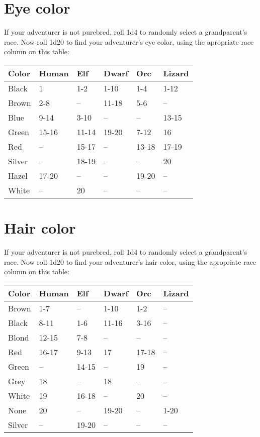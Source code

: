 \begin{multicols}{2}
\normalsize
\section{Eye color}
If your adventurer is not purebred, roll 1d4 to randomly select a grandparent's race. Now roll 1d20 to find your adventurer's eye color, using the apropriate race column on this table:

\begin{tcolorbox}[breakable,boxrule=0pt]
\begin{tabular}{l l l l l l}
Color & Human & Elf & Dwarf & Orc & Lizard\\
\midrule
Black & 1 & 1-2 & 1-10 & 1-4 & 1-12\\
Brown & 2-8 & -- & 11-18 & 5-6 & --\\
Blue & 9-14 & 3-10 & -- & -- & 13-15\\
Green & 15-16 & 11-14 & 19-20 & 7-12 & 16\\
Red & -- & 15-17 & -- & 13-18 & 17-19\\
Silver & -- & 18-19 & -- & -- & 20\\
Hazel & 17-20 & -- & -- & 19-20 & --\\
White & -- & 20 & -- & -- & --
\end{tabular}
\end{tcolorbox}

\section{Hair color}
If your adventurer is not purebred, roll 1d4 to randomly select a grandparent's race. Now roll 1d20 to find your adventurer's hair color, using the apropriate race column on this table:
\begin{tcolorbox}[breakable,boxrule=0pt]
\begin{tabular}{l l l l l l}
Color & Human & Elf & Dwarf & Orc & Lizard\\
\midrule

Brown & 1-7 & -- & 1-10 & 1-2 & --\\
Black & 8-11 & 1-6 & 11-16 & 3-16 & --\\
Blond & 12-15 & 7-8 & -- & -- & --\\
Red & 16-17 & 9-13 & 17 & 17-18 & --\\
Green & -- & 14-15 & -- & 19 & --\\
Grey & 18 & -- & 18 & -- & --\\
White & 19 & 16-18 & -- & 20 & --\\
None & 20 & -- & 19-20 & -- & 1-20\\
Silver & -- & 19-20 & -- & -- & --
\end{tabular}
\end{tcolorbox}

\end{multicols}
